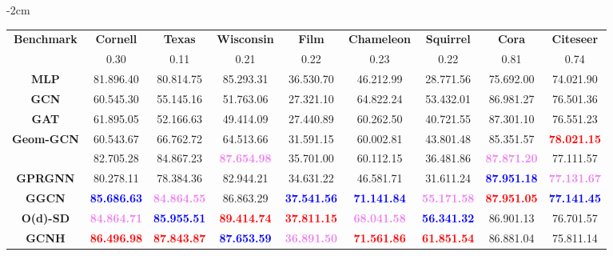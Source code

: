 \documentclass[conference]{IEEEtran}
\begin{document}
\begin{table*}[t]
    \footnotesize
    \centering
    \addtolength{\leftskip} {-2cm}
    \addtolength{\rightskip}{-2cm}
\begin{tabular}{ c c c c c c c c c }
    \toprule
    \textbf{Benchmark} & \textbf{Cornell} & \textbf{Texas} & \textbf{Wisconsin} & \textbf{Film} & \textbf{Chameleon} & \textbf{Squirrel} & \textbf{Cora} & \textbf{Citeseer} \\
     & 0.30 & 0.11 & 0.21 & 0.22 & 0.23 & 0.22 & 0.81 & 0.74 \\
    \midrule
    \textbf{MLP} & 81.896.40 & 80.814.75 & 85.293.31 & 36.530.70 & 46.212.99 & 28.771.56 & 75.692.00 & 74.021.90 \\
    \textbf{GCN} & 60.545.30 & 55.145.16 & 51.763.06 & 27.321.10 & 64.822.24 & 53.432.01 & 86.981.27 & 76.501.36 \\
    \textbf{GAT} & 61.895.05 & 52.166.63 & 49.414.09 & 27.440.89 & 60.262.50 & 40.721.55 & 87.301.10 & 76.551.23 \\
    \textbf{Geom-GCN} & 60.543.67 & 66.762.72 & 64.513.66 & 31.591.15 & 60.002.81 & 43.801.48 & 85.351.57 & \textbf{\textcolor{red}{78.021.15}} \\
    \textbf{\htwogcn{}} & 82.705.28 & 84.867.23 & \textbf{\textcolor{violet}{87.654.98}} & 35.701.00 & 60.112.15 & 36.481.86 & \textbf{\textcolor{violet}{87.871.20}} & 77.111.57 \\
    \textbf{GPRGNN} & 80.278.11 & 78.384.36 & 82.944.21 & 34.631.22 & 46.581.71 & 31.611.24 & \textbf{\textcolor{blue}{87.951.18}} & \textbf{\textcolor{violet}{77.131.67}} \\
    \textbf{GGCN} & \textbf{\textcolor{blue}{85.686.63}} & \textbf{\textcolor{violet}{84.864.55}} & 86.863.29 & \textbf{\textcolor{blue}{37.541.56}} & \textbf{\textcolor{blue}{71.141.84}} & \textbf{\textcolor{violet}{55.171.58}} & \textbf{\textcolor{red}{87.951.05}} & \textbf{\textcolor{blue}{77.141.45}} \\
    \textbf{O(d)-SD} & \textbf{\textcolor{violet}{84.864.71}} & \textbf{\textcolor{blue}{85.955.51}} & \textbf{\textcolor{red}{89.414.74}} & \textbf{\textcolor{red}{37.811.15}} & \textbf{\textcolor{violet}{68.041.58}} & \textbf{\textcolor{blue}{56.341.32}} & 86.901.13 & 76.701.57 \\
    \midrule
    \textbf{GCNH} & \textbf{\textcolor{red}{86.496.98}} & \textbf{\textcolor{red}{87.843.87}} & \textbf{\textcolor{blue}{87.653.59}} & \textbf{\textcolor{violet}{36.891.50}} & \textbf{\textcolor{red}{71.561.86}} & \textbf{\textcolor{red}{61.851.54}} & 86.881.04 & 75.811.14 \\
\bottomrule


\end{tabular}
\end{table*}
\end{document}
